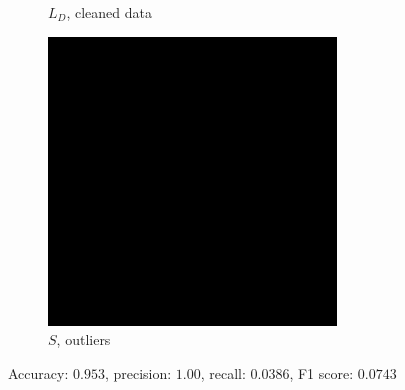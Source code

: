 \documentclass{beamer}
\theoremstyle{plain}
\theoremstyle{definition}
\theoremstyle{remark}
\begin{document}
\begin{frame}
\begin{figure}
\begin{subfigure}[b]{0.3\textwidth}
			\caption{$L_D$, cleaned data}
		\end{subfigure}
		\hfill
		\begin{subfigure}[b]{0.3\textwidth}
			\centering
			\includegraphics[width=\textwidth]{Images/l21S_8.png}
			\caption{$S$, outliers}
		\end{subfigure}
		   \caption{Accuracy: $0.953$, precision: $1.00$, recall: $0.0386$, F1 score: $0.0743$}
   \end{figure}
\end{frame}
\end{document}
